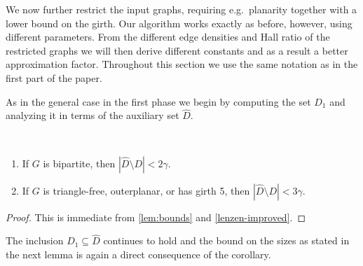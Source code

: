 

We now further restrict the input graphs, requiring e.g.\ planarity
together with a lower bound on the girth. Our algorithm works exactly as before, however,
using different parameters. From the different edge densities and
Hall ratio of
the restricted graphs we will then derive different constants and
as a result a better approximation factor. Throughout this section
we use the same notation as in the first part of the paper.

As in the general case in the first phase we begin by computing
the set $D_1$ and analyzing it in terms of the auxiliary set $\hat{D}$.


\begin{corollary}\label{a-lenzen-improved-planar}
  ~
  \begin{enumerate}
    \item If $G$ is bipartite, then $|\hat{D}\setminus D| < 2\gamma$.\smallskip
    \item If $G$ is triangle-free, outerplanar, or has girth 5,
      then $|\hat{D}\setminus D| < 3\gamma$.
  \end{enumerate}
\end{corollary}
\begin{proof}
This is immediate from \cref{lem:bounds} and \cref{lenzen-improved}.
\end{proof}

The inclusion $D_1\subseteq \hat D$ continues to hold and the bound
on the sizes as stated in the next lemma is again a direct consequence of the corollary.

\smallskip
{}

